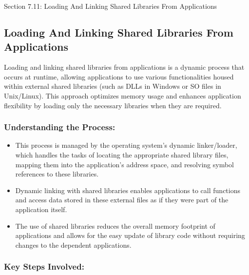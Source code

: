 \begin{notes}{Section 7.11: Loading And Linking Shared Libraries From Applications}
    \subsection*{Loading And Linking Shared Libraries From Applications}

    Loading and linking shared libraries from applications is a dynamic process that occurs at runtime, allowing applications to use various functionalities housed within external shared libraries 
    (such as DLLs in Windows or SO files in Unix/Linux). This approach optimizes memory usage and enhances application flexibility by loading only the necessary libraries when they are required. \vspace*{1em}
    
    \subsubsection*{Understanding the Process:}
    
    \begin{itemize}
        \item This process is managed by the operating system's dynamic linker/loader, which handles the tasks of locating the appropriate shared library files, mapping them into the application's 
        address space, and resolving symbol references to these libraries.
        \item Dynamic linking with shared libraries enables applications to call functions and access data stored in these external files as if they were part of the application itself.
        \item The use of shared libraries reduces the overall memory footprint of applications and allows for the easy update of library code without requiring changes to the dependent applications.
    \end{itemize}
    
    \subsubsection*{Key Steps Involved:}
    

\end{notes}
